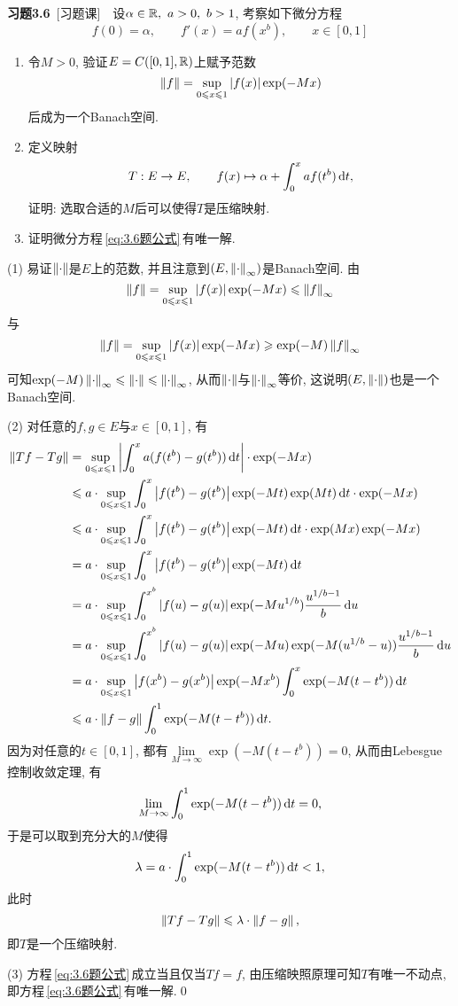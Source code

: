 	\textbf{习题3.6}\ [习题课]\ \ 设$ \alpha\in\mathbb{R},\ a>0,\ b>1 $, 考察如下微分方程
	\begin{equation}\label{eq:3.6题公式}
	f(0)=\alpha,\qquad f'(x)=af(x^b),\qquad x\in[0,1]
	\end{equation}
	\begin{enumerate}[(1)]
	\item 令$ M>0 $, 验证$ E=C([0,1],\mathbb{R}) $上赋予范数
	\[
	\left\| f \right\|=\sup_{0\leqslant x\leqslant 1}\left| f(x) \right| \exp(-Mx)
	\]
	后成为一个Banach空间.
	\item 定义映射
	\[
	T : E\to E,\qquad f(x)\mapsto\alpha+\int_0^x af(t^b)\,\mathrm{d} t,
	\]
	证明: 选取合适的$ M $后可以使得$ T $是压缩映射.
	\item 证明微分方程\,\eqref{eq:3.6题公式}\,有唯一解.
	\end{enumerate}
	\begin{Proof}
	(1) 易证$ \left\| \cdot \right\| $是$ E $上的范数, 并且注意到$ (E,\left\| \cdot \right\|_\infty) $是Banach空间. 由
	\[
	\left\| f \right\|=\sup_{0\leqslant x\leqslant 1}\left| f(x) \right| \exp(-Mx)\leqslant\left\| f \right\|_\infty
	\]
	与
	\[
	\left\| f \right\|=\sup_{0\leqslant x\leqslant 1}\left| f(x) \right| \exp(-Mx)\geqslant\exp(-M)\left\| f \right\|_\infty
	\]
	可知$ \exp(-M)\left\| \cdot \right\|_\infty\leqslant\left\| \cdot \right\|\leqslant\left\| \cdot \right\|_\infty $, 从而$ \left\| \cdot \right\| $与$ \left\| \cdot \right\|_\infty $等价, 这说明$ (E,\left\| \cdot \right\|) $也是一个Banach空间.
	
	(2) 对任意的$ f, g\in E $与$ x\in[0,1] $, 有
	\[
	\begin{aligned}
	\left\| Tf-Tg \right\| & =\sup_{0\leqslant x\leqslant 1}\left| \int_0^xa(f(t^b)-g(t^b))\,\mathrm{d} t \right| \cdot\exp(-Mx) \\
	& \leqslant a\cdot\sup_{0\leqslant x\leqslant 1}\int_0^x\left| f(t^b)-g(t^b) \right| \exp(-Mt)\exp(Mt)\,\mathrm{d} t\cdot\exp(-Mx) \\
	& \leqslant a\cdot\sup_{0\leqslant x\leqslant 1}\int_0^x\left| f(t^b)-g(t^b) \right| \exp(-Mt)\,\mathrm{d} t\cdot\exp(Mx)\exp(-Mx) \\
	& =a\cdot\sup_{0\leqslant x\leqslant 1}\int_0^x\left| f(t^b)-g(t^b) \right| \exp(-Mt)\,\mathrm{d} t\\
	& =a\cdot\sup_{0\leqslant x\leqslant 1}\int_0^{x^b}\left| f(u)-g(u) \right| \exp(-Mu^{1/b})\frac{u^{1/b-1}}{b}\,\mathrm{d} u\\
	& =a\cdot\sup_{0\leqslant x\leqslant 1}\int_0^{x^b}\left| f(u)-g(u) \right| \exp(-Mu)\exp(-M(u^{1/b}-u))\frac{u^{1/b-1}}{b}\,\mathrm{d} u\\
	& =a\cdot\sup_{0\leqslant x\leqslant 1}\left| f(x^b)-g(x^b) \right| \exp(-Mx^b)\int_0^x\exp(-M(t-t^b))\,\mathrm{d} t\\
	& \leqslant a\cdot\left\| f-g \right\|\int_0^1\exp(-M(t-t^b))\,\mathrm{d} t.
	\end{aligned}
	\]
	因为对任意的$ t\in[0,1] $, 都有$ \lim\limits_{M\to\infty}\exp(-M(t-t^b))=0 $, 从而由Lebesgue控制收敛定理, 有
	\[
	\lim_{M\to\infty}\int_0^1\exp(-M(t-t^b))\,\mathrm{d} t=0,
	\]
	于是可以取到充分大的$ M $使得
	\[
	\lambda=a\cdot\int_0^1\exp(-M(t-t^b))\,\mathrm{d} t<1,
	\]
	此时
	\[
	\left\| Tf-Tg \right\|\leqslant\lambda\cdot\left\| f-g \right\|,
	\]
	即$ T $是一个压缩映射.
	
	(3) 方程\,\eqref{eq:3.6题公式}\,成立当且仅当$ Tf=f $, 由压缩映照原理可知$ T $有唯一不动点, 即方程\,\eqref{eq:3.6题公式}\,有唯一解.\qed
	\end{Proof}
	
